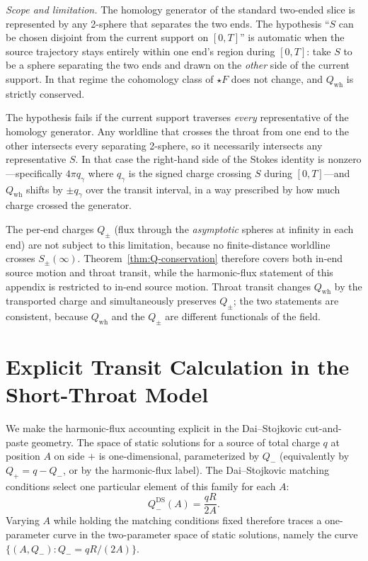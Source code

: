 \documentclass[aps,prd,onecolumn,nofootinbib,superscriptaddress]{revtex4-2}
\begin{document}
\emph{Scope and limitation.} The homology generator of the standard two-ended slice is represented by any 2-sphere that separates the two ends. The hypothesis ``$S$ can be chosen disjoint from the current support on $[0,T]$'' is automatic when the source trajectory stays entirely within one end's region during $[0,T]$: take $S$ to be a sphere separating the two ends and drawn on the \emph{other} side of the current support. In that regime the cohomology class of $\star F$ does not change, and $Q_{\mathrm{wh}}$ is strictly conserved.

The hypothesis fails if the current support traverses \emph{every} representative of the homology generator. Any worldline that crosses the throat from one end to the other intersects every separating 2-sphere, so it necessarily intersects any representative $S$. In that case the right-hand side of the Stokes identity is nonzero---specifically $4\pi q_\gamma$ where $q_\gamma$ is the signed charge crossing $S$ during $[0,T]$---and $Q_{\mathrm{wh}}$ shifts by $\pm q_\gamma$ over the transit interval, in a way prescribed by how much charge crossed the generator.

The per-end charges $Q_\pm$ (flux through the \emph{asymptotic} spheres at infinity in each end) are not subject to this limitation, because no finite-distance worldline crosses $S_\pm(\infty)$. Theorem~\ref{thm:Q-conservation} therefore covers both in-end source motion and throat transit, while the harmonic-flux statement of this appendix is restricted to in-end source motion. Throat transit changes $Q_{\mathrm{wh}}$ by the transported charge and simultaneously preserves $Q_\pm$; the two statements are consistent, because $Q_{\mathrm{wh}}$ and the $Q_\pm$ are different functionals of the field.

\section{Explicit Transit Calculation in the Short-Throat Model}
\label{app:transit}

We make the harmonic-flux accounting explicit in the Dai--Stojkovic cut-and-paste geometry. The space of static solutions for a source of total charge $q$ at position $A$ on side $+$ is one-dimensional, parameterized by $Q_-$ (equivalently by $Q_+ = q - Q_-$, or by the harmonic-flux label). The Dai--Stojkovic matching conditions select one particular element of this family for each $A$:
\begin{equation}
\label{eq:DS-selection}
Q_-^{\mathrm{DS}}(A) = \frac{qR}{2A}.
\end{equation}
Varying $A$ while holding the matching conditions fixed therefore traces a one-parameter curve in the two-parameter space of static solutions, namely the curve $\{(A, Q_-) : Q_- = qR/(2A)\}$.
\end{document}
